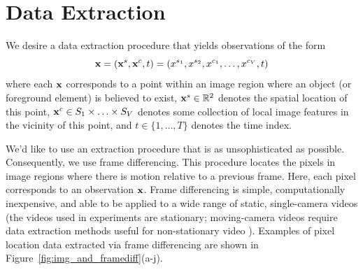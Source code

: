 \documentclass{article}
\begin{document}

\section{Data Extraction}
\label{sec:dataextraction}


We desire a data extraction procedure that yields observations of the form
\begin{equation}
\centering
\bold{x} = ( \bold{x}^{s}, \bold{x}^{c}, t ) = ( x^{s_{1}}, x^{s_{2}}, x^{c_{1}}, \ldots, x^{c_{V}}, t )
\end{equation}
where each $\bold{x}$ corresponds to a point within an image region where an object (or foreground element)  is believed to exist, $\bold{x}^{s} \in \mathbb{R}^{2}$ denotes the spatial location of this point, $\bold{x}^{c} \in S_{1} \times \ldots \times S_{V}$ denotes some collection of local image features in the vicinity of this point, and $t \in \{1, \ldots, T \}$ denotes the time index.

We'd like to use an extraction procedure that is as unsophisticated as possible. Consequently, we use frame differencing. This procedure locates the pixels in image regions where there is motion relative to a previous frame. Here, each pixel corresponds to an observation $\bold{x}$. Frame differencing is simple, computationally inexpensive, and able to be applied to a wide range of static, single-camera videos (the videos used in experiments are stationary; moving-camera videos require data extraction methods useful for non-stationary video \cite{chien2002efficient, zhang2007moving}). Examples of pixel location data extracted via frame differencing are shown in Figure~\ref{fig:img_and_framediff}(a-j).
\end{document}
